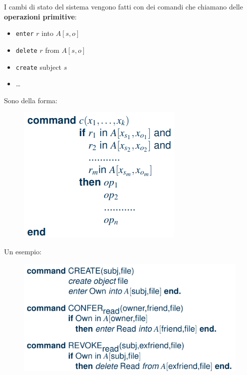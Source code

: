 \documentclass{report}
\begin{document}
\noindent I cambi di stato del sistema vengono fatti con dei comandi che chiamano delle \textbf{operazioni primitive}:
\begin{itemize}
    \item \texttt{enter} $r$ into $A[s,o]$
    \item \texttt{delete} $r$ from $A[s,o]$
    \item \texttt{create} subject $s$
    \item \dots
\end{itemize}

\noindent Sono della forma:

\begin{figure}[H]
    \centering
    \includegraphics[width=0.45\linewidth]{images/dac-comm.png}
\end{figure}

\noindent Un esempio:

\begin{figure}[H]
    \centering
    \includegraphics[width=0.65\linewidth]{images/dac2.png}
\end{figure}
\end{document}
